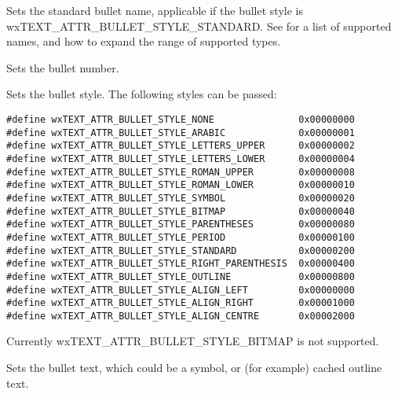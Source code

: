 
Sets the standard bullet name, applicable if the bullet style is wxTEXT\_ATTR\_BULLET\_STYLE\_STANDARD.
See  for a list
of supported names, and how to expand the range of supported types.

\label{wxrichtextattrsetbulletnumber}


Sets the bullet number.

\label{wxrichtextattrsetbulletstyle}


Sets the bullet style. The following styles can be passed:

{\small
\begin{verbatim}
#define wxTEXT_ATTR_BULLET_STYLE_NONE               0x00000000
#define wxTEXT_ATTR_BULLET_STYLE_ARABIC             0x00000001
#define wxTEXT_ATTR_BULLET_STYLE_LETTERS_UPPER      0x00000002
#define wxTEXT_ATTR_BULLET_STYLE_LETTERS_LOWER      0x00000004
#define wxTEXT_ATTR_BULLET_STYLE_ROMAN_UPPER        0x00000008
#define wxTEXT_ATTR_BULLET_STYLE_ROMAN_LOWER        0x00000010
#define wxTEXT_ATTR_BULLET_STYLE_SYMBOL             0x00000020
#define wxTEXT_ATTR_BULLET_STYLE_BITMAP             0x00000040
#define wxTEXT_ATTR_BULLET_STYLE_PARENTHESES        0x00000080
#define wxTEXT_ATTR_BULLET_STYLE_PERIOD             0x00000100
#define wxTEXT_ATTR_BULLET_STYLE_STANDARD           0x00000200
#define wxTEXT_ATTR_BULLET_STYLE_RIGHT_PARENTHESIS  0x00000400
#define wxTEXT_ATTR_BULLET_STYLE_OUTLINE            0x00000800
#define wxTEXT_ATTR_BULLET_STYLE_ALIGN_LEFT         0x00000000
#define wxTEXT_ATTR_BULLET_STYLE_ALIGN_RIGHT        0x00001000
#define wxTEXT_ATTR_BULLET_STYLE_ALIGN_CENTRE       0x00002000
\end{verbatim}
}

Currently wxTEXT\_ATTR\_BULLET\_STYLE\_BITMAP is not supported.

\label{wxrichtextattrsetbullettext}


Sets the bullet text, which could be a symbol, or (for example) cached outline text.

